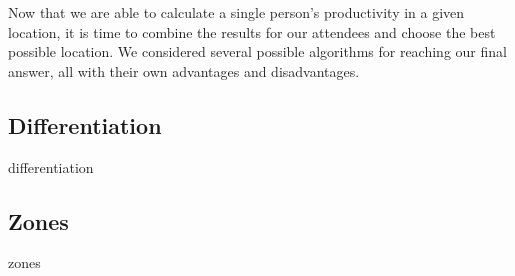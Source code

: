 
Now that we are able to calculate a single person's productivity in a given location, it is time to combine the results for our attendees and choose the best possible location. We considered several possible algorithms for reaching our final answer, all with their own advantages and disadvantages. 

\subsection{Differentiation}
{differentiation}

\subsection{Zones}
{zones}